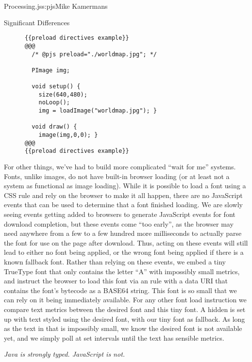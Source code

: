 \begin{aosachapter}{Processing.js}{s:pjs}{Mike Kamermans}
\begin{aosasect1}{Significant Differences}
\begin{verbatim}
      {{preload directives example}}
      @@@
        /* @pjs preload="./worldmap.jpg"; */

        PImage img;

        void setup() {
          size(640,480);
          noLoop();
          img = loadImage("worldmap.jpg"); }

        void draw() {
          image(img,0,0); }
      @@@
      {{preload directives example}}
\end{verbatim}

For other things, we've had to build more complicated ``wait for me''
systems. Fonts, unlike images, do not have built-in browser loading
(or at least not a system as functional as image loading). While it is
possible to load a font using a CSS  rule and rely on
the browser to make it all happen, there are no JavaScript events that
can be used to determine that a font finished loading. We are slowly
seeing events getting added to browsers to generate JavaScript events
for font download completion, but these events come ``too early'', as
the browser may need anywhere from a few to a few hundred more
milliseconds to actually parse the font for use on the page after
download. Thus, acting on these events will still lead to either no
font being applied, or the wrong font being applied if there is a
known fallback font. Rather than relying on these events, we embed
a tiny TrueType font that only contains the letter ``A'' with
impossibly small metrics, and instruct the browser to load this font
via an  rule with a data URI that contains the font's
bytecode as a BASE64 string. This font is so small that we can rely on
it being immediately available. For any other font load
instruction we compare text metrics between the desired font and this
tiny font. A hidden  is set up with text styled using the desired
font, with our tiny font as fallback. As long as the text in that 
is impossibly small, we know the desired font is not available yet,
and we simply poll at set intervals until the
text has sensible metrics.

\emph{Java is strongly typed. JavaScript is not.}


\end{aosasect1}
\end{aosachapter}
